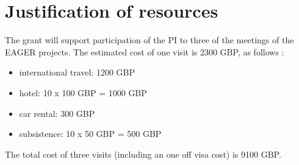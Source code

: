 
\section{Justification of resources}
\label{annex:just}

The grant will support participation of the PI to three of the meetings of the EAGER projects.  The estimated cost of one visit is 2300 GBP, as follows :

\begin{itemize}
\item international travel: 1200 GBP 
\item hotel: 10 x 100 GBP = 1000 GBP
\item car rental: 300 GBP
\item subsistence: 10 x 50 GBP = 500 GBP 
\end{itemize}


The total cost of three visits (including an one off visa cost) is 9100 GBP. 
